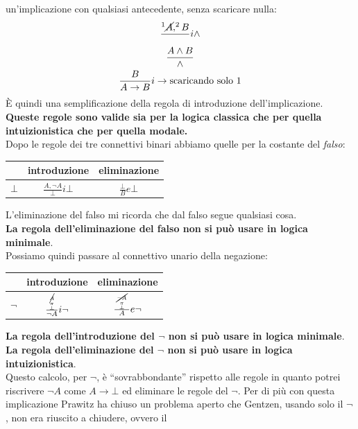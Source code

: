 \documentclass[a4paper,12pt, oneside]{book}
\newcommand*{\bfrac}[2]{\genfrac{}{}{0pt}{}{#1}{#2}}
\begin{document}
un'implicazione con qualsiasi antecedente, senza scaricare nulla:
\begin{gather*}
  \frac{^1\cancel{A},^2B}{}i\land\\
  \frac{A\land B}\land\\
  \frac{B}{A\to B}i\to\mbox{scaricando solo 1}
\end{gather*}
È quindi una semplificazione della regola di introduzione dell'implicazione.\\
\textbf{Queste regole sono valide sia per la logica classica che per quella
  intuizionistica che per quella modale.}\\
Dopo le regole dei tre connettivi binari abbiamo quelle per la costante del
\textit{falso}:
\begin{table}[H]
  \Large
  \centering
  \begin{tabular}{c||c|c}
    & introduzione & eliminazione\\
    \hline
    \hline
    $\bot$ & $\frac{A,\neg A}{\bot}i\bot$& $\frac{\bot}{B}e\bot$\\
    \hline
  \end{tabular}
\end{table}
L'eliminazione del falso mi ricorda che dal falso segue qualsiasi cosa. \\
\textbf{La regola dell'eliminazione del falso non si può usare in logica
  minimale}. \\
Possiamo quindi passare al connettivo unario della negazione:
\begin{table}[H]
  \Large
  \centering
  \begin{tabular}{c||c|c}
    & introduzione & eliminazione\\
    \hline
    \hline
    $\neg$ & $\frac{\bfrac{\bfrac{\cancel{A}}{\pi}}
             {\bot}}{\neg A}i\neg$& $\frac{\bfrac{\bfrac{\cancel{\neg A}}{\pi}}
             {\bot}}{ A}e\neg$\\
    \hline
  \end{tabular}
\end{table}
\textbf{La regola dell'introduzione del $\neg$ non si può usare in logica
  minimale}.\\
\textbf{La regola dell'eliminazione del $\neg$ non si può usare in logica
  intuizionistica}.\\
Questo calcolo, per $\neg$, è ``sovrabbondante'' rispetto alle regole in quanto
potrei riscrivere $\neg A$ come $A\to\bot$ ed eliminare le regole del
$\neg$. Per di più con questa implicazione Prawitz ha chiuso un problema aperto
che Gentzen, usando solo il $\neg$, non era riuscito a chiudere, ovvero il
\end{document}

